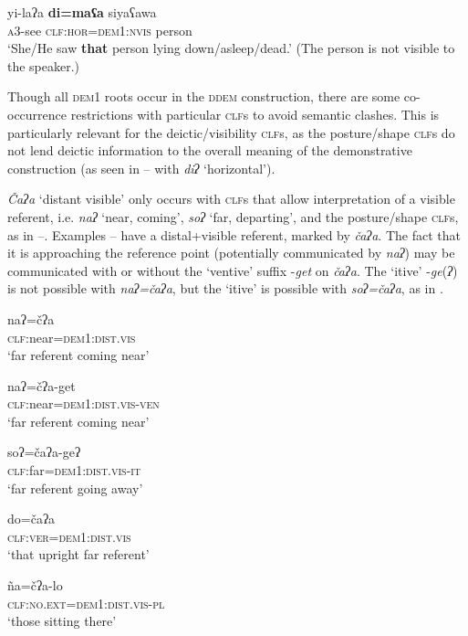 \documentclass[output=paper,colorlinks,citecolor=brown]{langscibook}
\begin{document}
\ea\label{ex:payne:36}
\gll  yi-laʔa  \textbf{di=maʕa}  siyaʕawa\\
 \textsc{a3}-see \textsc{clf:hor=dem1:nvis} person\\
\glt ‘She/He saw \textbf{that} person lying down/asleep/dead.’ (The person is not visible to the speaker.)
\z

Though all \textsc{dem1} roots occur in the \textsc{ddem} construction, there are some co-occurrence restrictions with particular \textsc{clf}s to avoid semantic clashes. This is particularly relevant for the deictic/visibility \textsc{clf}s, as the posture/shape \textsc{clf}s do not lend deictic information to the overall meaning of the demonstrative construction (as seen in – with \textit{diʔ} ‘horizontal’).

\textit{Čaʔa} ‘distant visible’ only occurs with \textsc{clf}s that allow interpretation of a visible referent, i.e. \textit{naʔ} ‘near, coming’, \textit{soʔ} ‘far, departing’, and the posture/shape \textsc{clf}s, as in –. Examples – have a distal+visible referent, marked by \textit{čaʔa}. The fact that it is approaching the reference point (potentially communicated by \textit{naʔ}) may be communicated with or without the ‘ventive’ suffix -\textit{get} on \textit{čaʔa}. The ‘itive’ -\textit{ge}(\textit{ʔ}) is not possible with \textit{naʔ=čaʔa}, but the ‘itive’ is possible with \textit{soʔ=čaʔa}, as in .

\ea\label{ex:payne:37}
\gll  naʔ=čʔa\\
     \textsc{clf}:near=\textsc{dem1:dist.vis}\\
     \glt ‘far referent coming near’
\z

\ea\label{ex:payne:38}
\gll  naʔ=čʔa-get\\
     \textsc{clf}:near=\textsc{dem1:dist.vis-ven}\\
     \glt ‘far referent coming near’
\z

\ea\label{ex:payne:39}
\gll soʔ=čaʔa-geʔ\\
 \textsc{clf}:far=\textsc{dem1:dist.vis}-\textsc{it}\\
\glt ‘far referent going away’
\z

\ea\label{ex:payne:40}
\gll do=čaʔa\\
 \textsc{clf:ver=dem1:dist.vis}\\
\glt ‘that upright far referent’
\z

\ea\label{ex:payne:41}
\gll  ña=čʔa-lo\\
     \textsc{clf:no.ext=dem1:dist.vis-pl}\\
\glt ‘those sitting there’
\z
\end{document}
